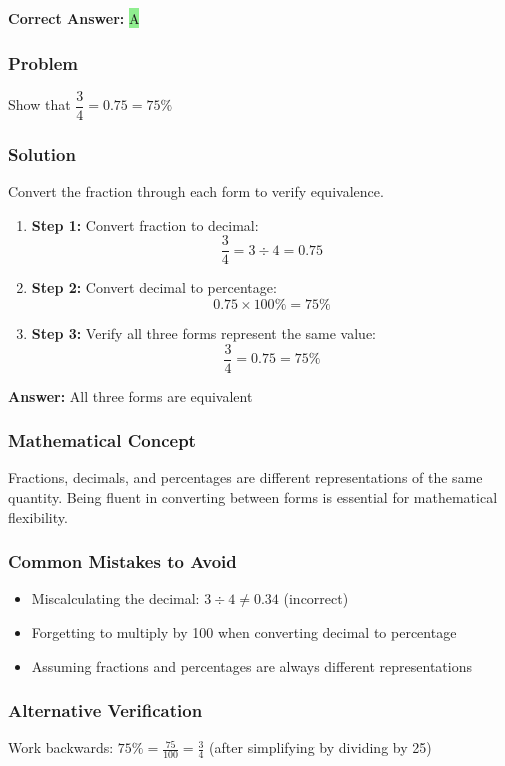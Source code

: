 \documentclass[12pt]{article}
\begin{document}
\textbf{Correct Answer: } \colorbox{lightgreen}{A}

\subsubsection*{Problem}
Show that $\dfrac{3}{4} = 0.75 = 75\%$

\subsubsection*{Solution}

Convert the fraction through each form to verify equivalence.

\begin{enumerate}
\item \textbf{Step 1:} Convert fraction to decimal:
  \[
  \frac{3}{4} = 3 \div 4 = 0.75
  \]
\item \textbf{Step 2:} Convert decimal to percentage:
  \[
  0.75 \times 100\% = 75\%
  \]
\item \textbf{Step 3:} Verify all three forms represent the same value:
  \[
  \frac{3}{4} = 0.75 = 75\%
  \]
\end{enumerate}

\textbf{Answer: } All three forms are equivalent

\subsubsection*{Mathematical Concept}
Fractions, decimals, and percentages are different representations of the same quantity. Being fluent in converting between forms is essential for mathematical flexibility.

\subsubsection*{Common Mistakes to Avoid}
\begin{itemize}
\item Miscalculating the decimal: $3 \div 4 \neq 0.34$ (incorrect)
\item Forgetting to multiply by 100 when converting decimal to percentage
\item Assuming fractions and percentages are always different representations
\end{itemize}

\subsubsection*{Alternative Verification}
Work backwards: $75\% = \frac{75}{100} = \frac{3}{4}$ (after simplifying by dividing by 25) 
\end{document}

